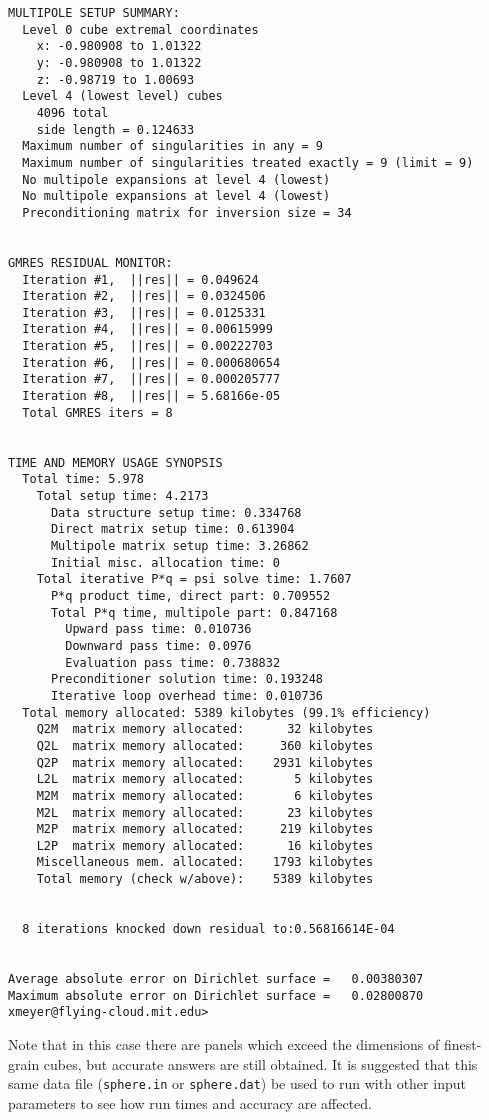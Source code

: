 \begin{verbatim}
MULTIPOLE SETUP SUMMARY:
  Level 0 cube extremal coordinates
    x: -0.980908 to 1.01322
    y: -0.980908 to 1.01322
    z: -0.98719 to 1.00693
  Level 4 (lowest level) cubes
    4096 total
    side length = 0.124633
  Maximum number of singularities in any = 9
  Maximum number of singularities treated exactly = 9 (limit = 9)
  No multipole expansions at level 4 (lowest)
  No multipole expansions at level 4 (lowest)
  Preconditioning matrix for inversion size = 34


GMRES RESIDUAL MONITOR:
  Iteration #1,  ||res|| = 0.049624
  Iteration #2,  ||res|| = 0.0324506
  Iteration #3,  ||res|| = 0.0125331
  Iteration #4,  ||res|| = 0.00615999
  Iteration #5,  ||res|| = 0.00222703
  Iteration #6,  ||res|| = 0.000680654
  Iteration #7,  ||res|| = 0.000205777
  Iteration #8,  ||res|| = 5.68166e-05
  Total GMRES iters = 8


TIME AND MEMORY USAGE SYNOPSIS
  Total time: 5.978
    Total setup time: 4.2173
      Data structure setup time: 0.334768
      Direct matrix setup time: 0.613904
      Multipole matrix setup time: 3.26862
      Initial misc. allocation time: 0
    Total iterative P*q = psi solve time: 1.7607
      P*q product time, direct part: 0.709552
      Total P*q time, multipole part: 0.847168
        Upward pass time: 0.010736
        Downward pass time: 0.0976
        Evaluation pass time: 0.738832
      Preconditioner solution time: 0.193248
      Iterative loop overhead time: 0.010736
  Total memory allocated: 5389 kilobytes (99.1% efficiency)
    Q2M  matrix memory allocated:      32 kilobytes
    Q2L  matrix memory allocated:     360 kilobytes
    Q2P  matrix memory allocated:    2931 kilobytes
    L2L  matrix memory allocated:       5 kilobytes
    M2M  matrix memory allocated:       6 kilobytes
    M2L  matrix memory allocated:      23 kilobytes
    M2P  matrix memory allocated:     219 kilobytes
    L2P  matrix memory allocated:      16 kilobytes
    Miscellaneous mem. allocated:    1793 kilobytes
    Total memory (check w/above):    5389 kilobytes


  8 iterations knocked down residual to:0.56816614E-04


Average absolute error on Dirichlet surface =   0.00380307
Maximum absolute error on Dirichlet surface =   0.02800870
xmeyer@flying-cloud.mit.edu> 
\end{verbatim}

Note that in this case there are panels which exceed the dimensions of 
finest-grain cubes, but accurate answers are still obtained.  It is 
suggested that this same data file ({\tt sphere.in} or {\tt sphere.dat}) be 
used to run \fas with other input parameters 
to see how run times and accuracy are affected.


